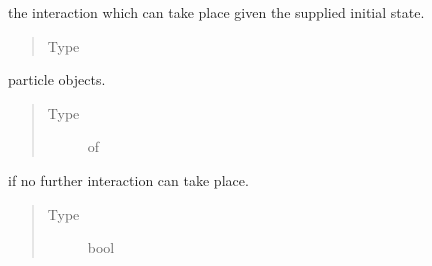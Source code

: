 \documentclass[letterpaper,10pt,english]{sphinxmanual}
\begin{document}
\begin{fulllineitems}
\begin{fulllineitems}
\end{fulllineitems}


\begin{fulllineitems}
\label{\detokenize{code_structure:scdc.event.Event.interaction}}
the interaction which can take place
given the supplied initial state.
\begin{quote}\begin{description}
\item[{Type}] \leavevmode
{}

\end{description}\end{quote}

\end{fulllineitems}


\begin{fulllineitems}
\label{\detokenize{code_structure:scdc.event.Event.out}}
particle  objects.
\begin{quote}\begin{description}
\item[{Type}] \leavevmode
{} of 

\end{description}\end{quote}

\end{fulllineitems}


\begin{fulllineitems}
\label{\detokenize{code_structure:scdc.event.Event.final}}
 if no further interaction can take place.
\begin{quote}\begin{description}
\item[{Type}] \leavevmode
bool

\end{description}\end{quote}


\end{fulllineitems}
\end{fulllineitems}
\end{document}
